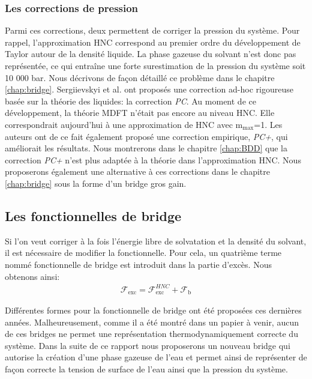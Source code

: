 \subsubsection{Les corrections de pression}
Parmi ces corrections, deux permettent de corriger la pression du système. Pour rappel, l'approximation HNC correspond au premier ordre du développement de Taylor autour de la densité liquide. La phase gazeuse du solvant n'est donc pas représentée, ce qui entraîne une forte surestimation de la pression du système soit 10 000 bar. Nous décrivons de façon détaillé ce problème dans le chapitre \ref{chap:bridge}. Sergiievskyi et al. \cite{sergiievskyi_solvation_2015,sergiievskyi_pressure_2015} ont proposés une correction ad-hoc rigoureuse basée sur la théorie des liquides: la correction \textit{PC}. Au moment de ce développement, la théorie MDFT n'était pas encore au niveau HNC. Elle correspondrait aujourd'hui à une approximation de HNC avec $\mathrm{m}_\mathrm{max}$=1. Les auteurs ont de ce fait également proposé une correction empirique, \textit{PC+}, qui améliorait les résultats\cite{misin_salting-out_2016, misin_hydration_2016, misin_communication:_2015}. Nous montrerons dans le chapitre \ref{chap:BDD} que la correction \textit{PC+} n'est plus adaptée à la théorie dans l'approximation HNC. Nous proposerons également une alternative à ces corrections dans le chapitre \ref{chap:bridge} sous la forme d'un bridge gros gain.




\subsection{Les fonctionnelles de bridge}
Si l'on veut corriger à la fois l'énergie libre de solvatation et la densité du solvant, il est nécessaire de modifier la fonctionnelle. Pour cela, un quatrième terme nommé fonctionnelle de bridge est introduit dans la partie d'excès. Nous obtenons ainsi:
\begin{eqnarray}
\mathcal{F}_\mathrm{exc} = \mathcal{F}_\mathrm{exc}^{HNC} + \mathcal{F}_\mathrm{b}
\end{eqnarray}

Différentes formes pour la fonctionnelle de bridge ont été proposées ces dernières années\cite{levesque_scalar_2012,jeanmairet_molecular_2013,jeanmairet_molecular_2015}. Malheureusement, comme il a été montré dans un papier à venir, aucun de ces bridges ne permet une représentation thermodynamiquement correcte du système. Dans la suite de ce rapport nous proposerons un nouveau bridge qui autorise la création d'une phase gazeuse de l'eau et permet ainsi de représenter de façon correcte la tension de surface de l'eau ainsi que la pression du système.



